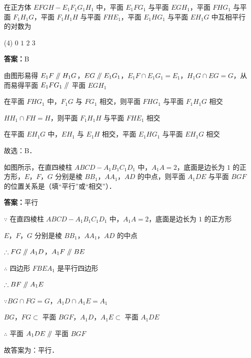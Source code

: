 \vspace{2em}


\begin{example}[\bkstar{2}{5}]
在正方体 $EFGH-E_1F_1G_1H_1$ 中，平面 $E_1FG_1$ 与平面 $EGH_1$，平面 $FHG_1$ 与平面 $F_1H_1G$，平面 $F_1H_1H$ 与平面 $FHE_1$，平面 $E_1HG_1$ 与平面 $EH_1G$ 中互相平行的对数为
\begin{tasks}(4)
    \task $0$
    \task $1$
    \task $2$
    \task $3$
\end{tasks}
\end{example}
\begin{solution}
\textbf{答案：}B

由图形易得 $E_1F\mathrel{/\mkern-5mu/} H_1G$，$EG\mathrel{/\mkern-5mu/} E_1G_1$，$E_1F\cap E_1G_1=E_1$，$H_1G\cap EG=G$，从而易得平面 $E_1FG_1\mathrel{/\mkern-5mu/}$ 平面 $EGH_1$

在平面 $FHG_1$ 中，$F_1G$ 与 $FG_1$ 相交，则平面 $FHG_1$ 与平面 $F_1H_1G$ 相交

$HH_1\cap FH=H$，则平面 $F_1H_1H$ 与平面 $FHE_1$ 相交

在平面 $EH_1G$ 中，$EH_1$ 与 $E_1H$ 相交，平面 $E_1HG_1$ 与平面 $EH_1G$ 相交

故选：B．
\end{solution}

\vspace{2em}

\begin{example}[\bkstar{2}{5}]
如图所示，在直四棱柱 $ABCD-A_1B_1C_1D_1$ 中，$A_1A=2$，底面是边长为 $1$ 的正方形，$E$，$F$，$G$ 分别是棱 $BB_1$，$AA_1$，$AD$ 的中点，则平面 $A_1DE$ 与平面 $BGF$ 的位置关系是（填“平行”或“相交”）．
\end{example}
\begin{solution}
\textbf{答案：}平行

$\because$ 在直四棱柱 $ABCD-A_1B_1C_1D_1$ 中，$A_1A=2$，底面是边长为 $1$ 的正方形

$E$，$F$，$G$ 分别是棱 $BB_1$，$AA_1$，$AD$ 的中点

$\therefore FG\mathrel{/\mkern-5mu/} A_1D$，$A_1F\mathrel{/\mkern-5mu/} BE$

$\therefore$ 四边形 $FBEA_1$ 是平行四边形

$\therefore BF\mathrel{/\mkern-5mu/} A_1E$

$\because BG\cap FG=G$，$A_1D\cap A_1E=A_1$

$BG$，$FG\subset$ 平面 $BGF$，$A_1D$，$A_1E\subset$ 平面 $A_1DE$

$\therefore$ 平面 $A_1DE\mathrel{/\mkern-5mu/}$ 平面 $BGF$

故答案为：平行．
\end{solution}

